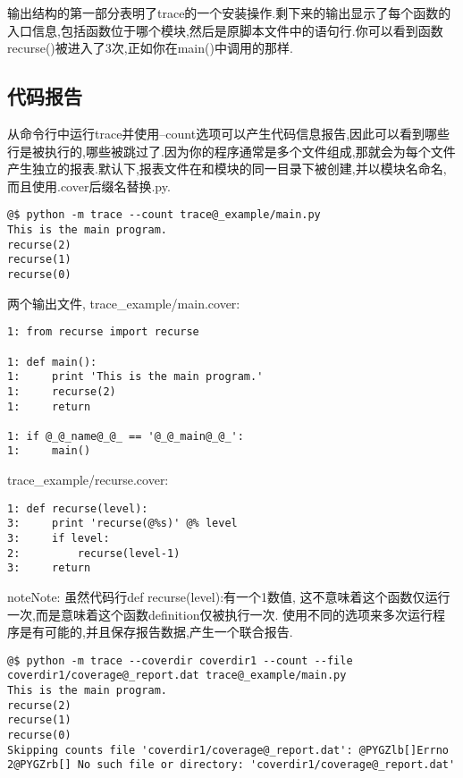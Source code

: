 \documentclass[a4paper,10pt,english]{manual}
\begin{document}
输出结构的第一部分表明了trace的一个安装操作.剩下来的输出显示了每个函数的入口信息,包括函数位于哪个模块,然后是原脚本文件中的语句行.你可以看到函数recurse()被进入了3次,正如你在main()中调用的那样.


\subsection{代码报告}

从命令行中运行trace并使用--count选项可以产生代码信息报告,因此可以看到哪些行是被执行的,哪些被跳过了.因为你的程序通常是多个文件组成,那就会为每个文件产生独立的报表.默认下,报表文件在和模块的同一目录下被创建,并以模块名命名,而且使用.cover后缀名替换.py.

\begin{Verbatim}[commandchars=@\[\]]
@$ python -m trace --count trace@_example/main.py
This is the main program.
recurse(2)
recurse(1)
recurse(0)
\end{Verbatim}

两个输出文件, trace\_example/main.cover:

\begin{Verbatim}[commandchars=@\[\]]
1: from recurse import recurse

1: def main():
1:     print 'This is the main program.'
1:     recurse(2)
1:     return

1: if @_@_name@_@_ == '@_@_main@_@_':
1:     main()
\end{Verbatim}

trace\_example/recurse.cover:

\begin{Verbatim}[commandchars=@\[\]]
1: def recurse(level):
3:     print 'recurse(@%s)' @% level
3:     if level:
2:         recurse(level-1)
3:     return
\end{Verbatim}

\begin{notice}{note}{Note:}
虽然代码行def recurse(level):有一个1数值, 这不意味着这个函数仅运行一次,而是意味着这个函数definition仅被执行一次.
使用不同的选项来多次运行程序是有可能的,并且保存报告数据,产生一个联合报告.
\end{notice}

\begin{Verbatim}[commandchars=@\[\]]
@$ python -m trace --coverdir coverdir1 --count --file coverdir1/coverage@_report.dat trace@_example/main.py
This is the main program.
recurse(2)
recurse(1)
recurse(0)
Skipping counts file 'coverdir1/coverage@_report.dat': @PYGZlb[]Errno 2@PYGZrb[] No such file or directory: 'coverdir1/coverage@_report.dat'
\end{Verbatim}
\end{document}
